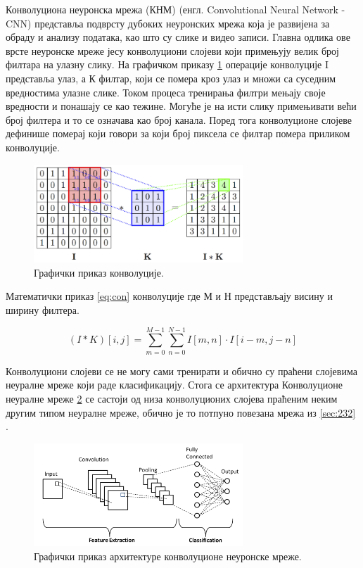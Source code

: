 \documentclass[a4paper, 12pt, master, utf8]{etf}
\begin{document}
Конволуциона неуронска мрежа (КНМ) (енгл. Convolutional Neural Network - CNN) представља подврсту дубоких неуронских мрежа 
која је развијена за обраду и анализу података, као што су слике и видео записи. Главна одлика ове врсте неуронске мреже јесу конволуциони слојеви који примењују велик број 
филтара на улазну слику. На графичком приказу \ref{fig:convolution} операције конволуције I представља улаз, а К филтар, који се помера кроз улаз и множи са суседним вредностима улазне слике. Током процеса тренирања 
филтри мењају своје вредности и понашају се као тежине. Могуће је на исти слику примењивати већи број филтера и то се означава као број канала. Поред тога конволуционе слојеве дефинише померај који говори за који број пиксела се филтар помера приликом конволуције.

\begin{figure}[h]
    \centering
    \includegraphics[width=0.7\textwidth]{images/convolution.png}
    \caption{Графички приказ конволуције. \cite{s_mohamed_detection_2017}}
    \label{fig:convolution}
\end{figure}

Математички приказ \ref{eq:con} конволуције где М и Н представљају висину и ширину филтера.

\begin{equation}
    (I * K)[i, j] = \sum_{m=0}^{M-1} \sum_{n=0}^{N-1} I[m, n] \cdot I[i-m, j-n]
    \label{eq:con}
\end{equation}

Конволуциони слојеви се не могу сами тренирати и обично су праћени слојевима неуралне мреже који раде класификацију.
Стога се архитектура Конволуционе неуралне мреже \ref{fig:cnn} се састоји од низа конволуционих слојева праћеним неким другим типом неуралне мреже, обично је то потпуно повезана мрежа из \ref{sec:232} .

\begin{figure}[h]
    \centering
    \includegraphics[width=0.7\textwidth]{images/cnn.png}
    \caption{Графички приказ архитектуре конволуционе неуронске мреже. \cite{s_mohamed_detection_2017}}
    \label{fig:cnn}
\end{figure}
\end{document}
